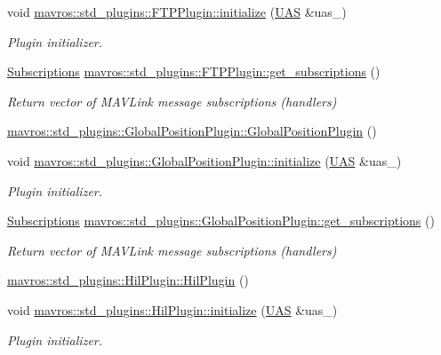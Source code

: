 \begin{DoxyCompactItemize}
\item 
void \mbox{\hyperlink{group__plugin_ga7249eb6cdb3de93652df3b8cf3ea53c0}{mavros\+::std\+\_\+plugins\+::\+F\+T\+P\+Plugin\+::initialize}} (\mbox{\hyperlink{classmavros_1_1UAS}{U\+AS}} \&uas\+\_\+)
\begin{DoxyCompactList}\small\item\em Plugin initializer. \end{DoxyCompactList}\item 
\mbox{\hyperlink{group__plugin_ga8967d61fc77040e0c3ea5a4585d62a09}{Subscriptions}} \mbox{\hyperlink{group__plugin_ga75b1dc5d6bd1dc976c4a974b93d03e92}{mavros\+::std\+\_\+plugins\+::\+F\+T\+P\+Plugin\+::get\+\_\+subscriptions}} ()
\begin{DoxyCompactList}\small\item\em Return vector of M\+A\+V\+Link message subscriptions (handlers) \end{DoxyCompactList}\item 
\mbox{\hyperlink{group__plugin_ga0f7a01f0082226ac8f883f5ce9b53b3d}{mavros\+::std\+\_\+plugins\+::\+Global\+Position\+Plugin\+::\+Global\+Position\+Plugin}} ()
\item 
void \mbox{\hyperlink{group__plugin_ga41dceb095bbd1b8b99c46c9a277bb7a9}{mavros\+::std\+\_\+plugins\+::\+Global\+Position\+Plugin\+::initialize}} (\mbox{\hyperlink{classmavros_1_1UAS}{U\+AS}} \&uas\+\_\+)
\begin{DoxyCompactList}\small\item\em Plugin initializer. \end{DoxyCompactList}\item 
\mbox{\hyperlink{group__plugin_ga8967d61fc77040e0c3ea5a4585d62a09}{Subscriptions}} \mbox{\hyperlink{group__plugin_ga0dfa5c046201515b43ef6e843b74c89a}{mavros\+::std\+\_\+plugins\+::\+Global\+Position\+Plugin\+::get\+\_\+subscriptions}} ()
\begin{DoxyCompactList}\small\item\em Return vector of M\+A\+V\+Link message subscriptions (handlers) \end{DoxyCompactList}\item 
\mbox{\hyperlink{group__plugin_ga1c478bd6c8e29b4739d1687f1f4645aa}{mavros\+::std\+\_\+plugins\+::\+Hil\+Plugin\+::\+Hil\+Plugin}} ()
\item 
void \mbox{\hyperlink{group__plugin_ga1c3a000c7280d16696fcb006961ae7d2}{mavros\+::std\+\_\+plugins\+::\+Hil\+Plugin\+::initialize}} (\mbox{\hyperlink{classmavros_1_1UAS}{U\+AS}} \&uas\+\_\+)
\begin{DoxyCompactList}\small\item\em Plugin initializer. \end{DoxyCompactList}\item 

\end{DoxyCompactItemize}
